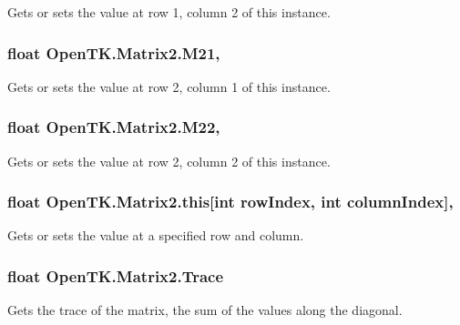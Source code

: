 Gets or sets the value at row 1, column 2 of this instance. 

\hypertarget{struct_open_t_k_1_1_matrix2_af0d21a4607e71a4c82c01db39cbafc2c}{
\subsubsection[{M21}]{\setlength{\rightskip}{0pt plus 5cm}float Open\-T\-K.\-Matrix2.\-M21\hspace{0.3cm}{\ttfamily [get]}, {\ttfamily [set]}}}\label{struct_open_t_k_1_1_matrix2_af0d21a4607e71a4c82c01db39cbafc2c}


Gets or sets the value at row 2, column 1 of this instance. 

\hypertarget{struct_open_t_k_1_1_matrix2_a6b9b6b7e323353efcd52f972e9e11011}{
\subsubsection[{M22}]{\setlength{\rightskip}{0pt plus 5cm}float Open\-T\-K.\-Matrix2.\-M22\hspace{0.3cm}{\ttfamily [get]}, {\ttfamily [set]}}}\label{struct_open_t_k_1_1_matrix2_a6b9b6b7e323353efcd52f972e9e11011}


Gets or sets the value at row 2, column 2 of this instance. 

\hypertarget{struct_open_t_k_1_1_matrix2_ace510988a666db0540be994392b94ae6}{
\subsubsection[{this[int row\-Index, int column\-Index]}]{\setlength{\rightskip}{0pt plus 5cm}float Open\-T\-K.\-Matrix2.\-this\mbox{[}int row\-Index, int column\-Index\mbox{]}\hspace{0.3cm}{\ttfamily [get]}, {\ttfamily [set]}}}\label{struct_open_t_k_1_1_matrix2_ace510988a666db0540be994392b94ae6}


Gets or sets the value at a specified row and column. 

\hypertarget{struct_open_t_k_1_1_matrix2_ac3f3859dc69583c8924ac70e1782b0e0}{
\subsubsection[{Trace}]{\setlength{\rightskip}{0pt plus 5cm}float Open\-T\-K.\-Matrix2.\-Trace\hspace{0.3cm}{\ttfamily [get]}}}\label{struct_open_t_k_1_1_matrix2_ac3f3859dc69583c8924ac70e1782b0e0}


Gets the trace of the matrix, the sum of the values along the diagonal. 

